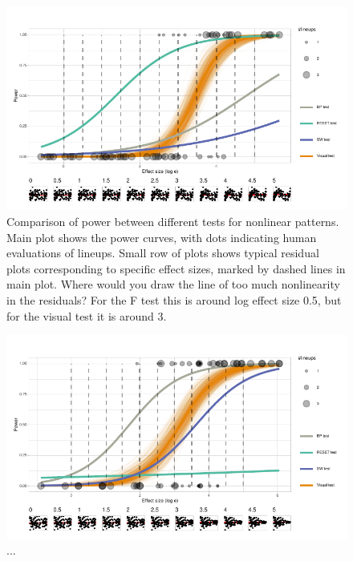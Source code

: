 \documentclass[]{interact}
\theoremstyle{plain}%
\theoremstyle{definition}
\theoremstyle{remark}
\begin{document}
\begin{figure}

{\centering \includegraphics[width=1\linewidth]{paper_comparison_files/figure-latex/polypower-1} 

}

\caption{Comparison of power between different tests for nonlinear patterns. Main plot shows the power curves, with dots indicating human evaluations of lineups. Small row of plots shows typical residual plots corresponding to specific effect sizes, marked by dashed lines in main plot. Where would you draw the line of too much nonlinearity in the residuals? For the F test this is around log effect size 0.5, but for the visual test it is around 3.}\label{fig:polypower}
\end{figure}

\begin{figure}

{\centering \includegraphics[width=1\linewidth]{paper_comparison_files/figure-latex/heterpower-1} 

}

\caption{...}\label{fig:heterpower}
\end{figure}
\end{document}
